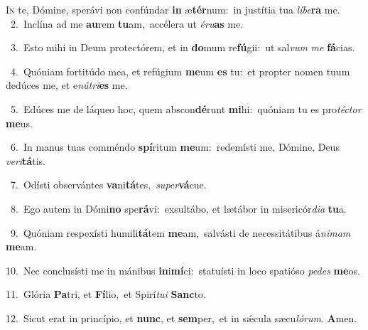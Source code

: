\lettrine{\initial\textcolor{\initialcolor}{I}}{n} te, Dómine, sperávi non confúndar \textbf{in} æ\-\textbf{tér}\-num:~\star in justítia tua \textit{lí}\-\textit{be}\textbf{ra} me.\\
{\numbfont\textcolor{\numbcolor}{~2.}}~Inclína ad me \textbf{au}\-rem \textbf{tu}\-am,~\star accélera ut \textit{é}\-\textit{ru}\textbf{as} me.\par
{\numbfont\textcolor{\numbcolor}{~3.}}~Esto mihi in Deum protectórem, et in \textbf{do}\-mum re\-\textbf{fú}\-gii:~\star ut sal\textit{vum} \textit{me} \textbf{fá}\-cias.\par
{\numbfont\textcolor{\numbcolor}{~4.}}~Quóniam fortitúdo mea, et refúgium \textbf{me}\-um \textbf{es} tu:~\star et propter nomen tuum dedúces me, et e\-\textit{nú}\-\textit{tri}\textbf{es} me.\par
{\numbfont\textcolor{\numbcolor}{~5.}}~Edúces me de láqueo hoc, quem abscon\-\textbf{dé}\-runt \textbf{mi}\-hi:~\star quóniam tu es pro\-\textit{téc}\-\textit{tor} \textbf{me}\-us.\par
{\numbfont\textcolor{\numbcolor}{~6.}}~In manus tuas comméndo \textbf{spí}\-ritum \textbf{me}\-um:~\star redemísti me, Dómine, Deus \textit{ve}\-\textit{ri}\textbf{tá}tis.\par
{\numbfont\textcolor{\numbcolor}{~7.}}~Odísti observántes \textbf{va}\-ni\-\textbf{tá}\-tes,~\star \textit{su}\-\textit{per}\textbf{vá}cue.\par
{\numbfont\textcolor{\numbcolor}{~8.}}~Ego autem in Dómi\textbf{no} spe\-\textbf{rá}\-vi:~\star exsultábo, et lætábor in misericór\-\textit{di}\-\textit{a} \textbf{tu}\-a.\par
{\numbfont\textcolor{\numbcolor}{~9.}}~Quóniam respexísti humili\-\textbf{tá}\-tem \textbf{me}\-am,~\star salvásti de necessitátibus á\-\textit{ni}\-\textit{mam} \textbf{me}\-am.\par
{\numbfont\textcolor{\numbcolor}{10.}}~Nec conclusísti me in mánibus \textbf{in}\-i\-\textbf{mí}\-ci:~\star statuísti in loco spatióso \textit{pe}\-\textit{des} \textbf{me}\-os.\par
{\numbfont\textcolor{\numbcolor}{11.}}~Glória \textbf{Pa}\-tri, et \textbf{Fí}\-lio,~\star et Spirí\-\textit{tu}\-\textit{i} \textbf{Sanc}\-to.\par
{\numbfont\textcolor{\numbcolor}{12.}}~Sicut erat in princípio, et \textbf{nunc}\-, et \textbf{sem}\-per,~\star et in sǽcula sæcu\-\textit{ló}\-\textit{rum}. \textbf{A}\-men.\par

